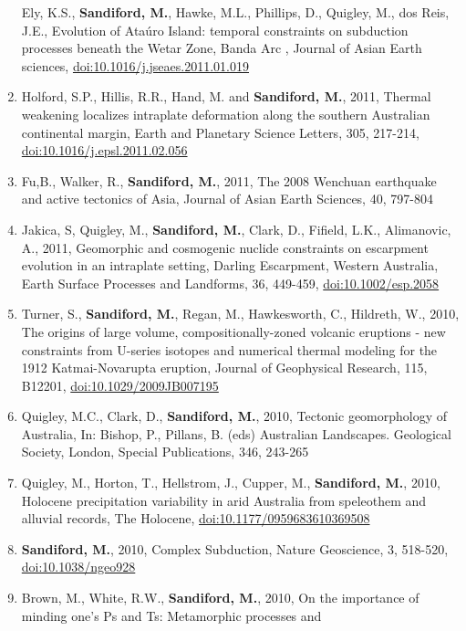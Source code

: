 \documentclass[
]{article}
\begin{document}
\begin{enumerate}
  Ely, K.S., \textbf{Sandiford, M.}, Hawke, M.L., Phillips, D., Quigley,
  M., dos Reis, J.E., Evolution of Ataúro Island: temporal constraints
  on subduction processes beneath the Wetar Zone, Banda Arc , Journal of
  Asian Earth sciences, \url{doi:10.1016/j.jseaes.2011.01.019}
\item
  Holford, S.P., Hillis, R.R., Hand, M. and \textbf{Sandiford, M.},
  2011, Thermal weakening localizes intraplate deformation along the
  southern Australian continental margin, Earth and Planetary Science
  Letters, 305, 217-214, \url{doi:10.1016/j.epsl.2011.02.056}
\item
  Fu,B., Walker, R., \textbf{Sandiford, M.}, 2011, The 2008 Wenchuan
  earthquake and active tectonics of Asia, Journal of Asian Earth
  Sciences, 40, 797-804 
\item
  Jakica, S, Quigley, M., \textbf{Sandiford, M.}, Clark, D., Fifield,
  L.K., Alimanovic, A., 2011, Geomorphic and cosmogenic nuclide
  constraints on escarpment evolution in an intraplate setting, Darling
  Escarpment, Western Australia, Earth Surface Processes and Landforms,
  36, 449-459, \url{doi:10.1002/esp.2058} 
\item
  Turner, S., \textbf{Sandiford, M.}, Regan, M., Hawkesworth, C.,
  Hildreth, W., 2010, The origins of large volume, compositionally-zoned
  volcanic eruptions - new constraints from U-series isotopes and
  numerical thermal modeling for the 1912 Katmai-Novarupta eruption,
  Journal of Geophysical Research, 115, B12201,
  \url{doi:10.1029/2009JB007195} 
\item
  Quigley, M.C., Clark, D., \textbf{Sandiford, M.}, 2010, Tectonic
  geomorphology of Australia, In: Bishop, P., Pillans, B. (eds)
  Australian Landscapes. Geological Society, London, Special
  Publications, 346, 243-265 
\item
  Quigley, M., Horton, T., Hellstrom, J., Cupper, M., \textbf{Sandiford,
  M.}, 2010, Holocene precipitation variability in arid Australia from
  speleothem and alluvial records, The Holocene,
  \url{doi:10.1177/0959683610369508} 
\item
  \textbf{Sandiford, M.}, 2010, Complex Subduction, Nature Geoscience,
  3, 518-520, \url{doi:10.1038/ngeo928} 
\item
  Brown, M., White, R.W., \textbf{Sandiford, M.}, 2010, On the
  importance of minding one's Ps and Ts: Metamorphic processes and

\end{enumerate}
\end{document}
